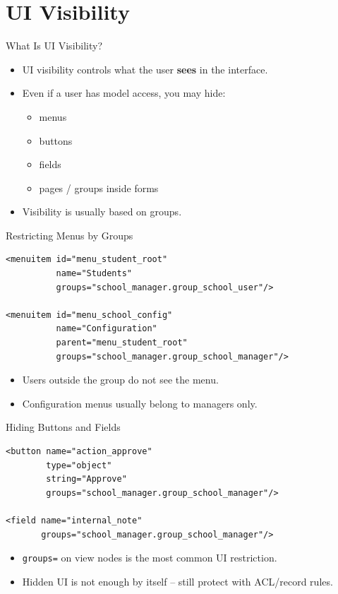 \section{UI Visibility}

\begin{frame}{What Is UI Visibility?}
	\begin{itemize}
		\item UI visibility controls what the user \textbf{sees} in the interface.
		\item Even if a user has model access, you may hide:
		\begin{itemize}
			\item menus
			\item buttons
			\item fields
			\item pages / groups inside forms
		\end{itemize}
		\item Visibility is usually based on groups.
	\end{itemize}
\end{frame}

\begin{frame}[fragile]{Restricting Menus by Groups}
\begin{lstlisting}[style=xml]
<menuitem id="menu_student_root"
		  name="Students"
		  groups="school_manager.group_school_user"/>

<menuitem id="menu_school_config"
		  name="Configuration"
		  parent="menu_student_root"
		  groups="school_manager.group_school_manager"/>
\end{lstlisting}
	\begin{itemize}
		\item Users outside the group do not see the menu.
		\item Configuration menus usually belong to managers only.
	\end{itemize}
\end{frame}

\begin{frame}[fragile]{Hiding Buttons and Fields}
\begin{lstlisting}[style=xml]
<button name="action_approve"
		type="object"
		string="Approve"
		groups="school_manager.group_school_manager"/>

<field name="internal_note"
	   groups="school_manager.group_school_manager"/>
\end{lstlisting}
	\begin{itemize}
		\item \texttt{groups=} on view nodes is the most common UI restriction.
		\item Hidden UI is not enough by itself -- still protect with ACL/record rules.
	\end{itemize}
\end{frame}

